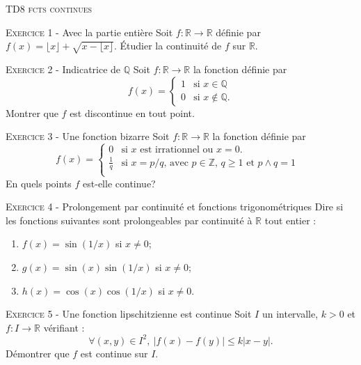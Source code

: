 \documentclass[11pt]{article}
\begin{document}
 

\begin{center}\textsc{{\huge TD8 fcts continues}}\end{center}



\vskip0.3cm\noindent\textsc{Exercice 1} - Avec la partie entière
\vskip0.2cm
Soit $f:\mathbb R\to\mathbb R$ définie par $f(x)=\lfloor x\rfloor +\sqrt{x-\lfloor x\rfloor }$.
\'Etudier la continuité de $f$ sur $\mathbb R$.




\vskip0.3cm\noindent\textsc{Exercice 2} - Indicatrice de $\mathbb Q$
\vskip0.2cm
Soit $f:\mathbb R\to\mathbb R$ la fonction définie par 
$$f(x)=\left\{
\begin{array}{ll}
1&\textrm{si }x\in\mathbb Q\\
0&\textrm{si }x\notin \mathbb Q.
\end{array}\right.$$
Montrer que $f$ est discontinue en tout point.




\vskip0.3cm\noindent\textsc{Exercice 3} - Une fonction bizarre
\vskip0.2cm
Soit $f:\mathbb R\to \mathbb R$ la fonction définie par
$$f(x)=\left\{
\begin{array}{ll}
0&\textrm{si $x$ est irrationnel ou $x=0$.}\\
\frac{1}{q}&\textrm{si $x=p/q$, avec $p\in \mathbb Z$, $q\geq 1$ et $p\wedge q=1$ }\\
\end{array}\right.$$
En quels points $f$ est-elle continue?




\vskip0.3cm\noindent\textsc{Exercice 4} - Prolongement par continuité et fonctions trigonométriques
\vskip0.2cm
Dire si les fonctions suivantes sont prolongeables par continuité à $\mathbb R$ tout entier :
\begin{enumerate}
\item $f(x)=\sin(1/x)$ si $x\neq 0$;
\item $g(x)=\sin(x)\sin(1/x)$ si $x\neq 0$;
\item $h(x)=\cos(x)\cos(1/x)$ si $x\neq 0$.
\end{enumerate}




\vskip0.3cm\noindent\textsc{Exercice 5} - Une fonction lipschitzienne est continue
\vskip0.2cm
Soit $I$ un intervalle, $k>0$ et $f:I\to\mathbb R$ vérifiant :
$$\forall (x,y)\in I^2,\ |f(x)-f(y)|\leq k|x-y|.$$
Démontrer que $f$ est continue sur $I$.
\end{document}
